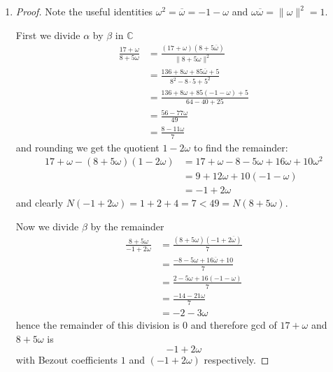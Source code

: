 \documentclass[12pt]{article}
\begin{document}
\begin{enumerate}
    \item[(ii)]
    \begin{proof}
        Note the useful identities $\omega^2 = \overline{\omega} = -1 - \omega$ and $\omega\overline{\omega} = \| \omega \|^2 = 1$.

        First we divide $\alpha$ by $\beta$ in $\mathbb C$
        \begin{align*}
            \frac{17 + \omega}{8 + 5\omega} &= \frac{(17 + \omega)(8 + 5\overline{\omega})}{\| 8 + 5\omega \|^2} \\
            &= \frac{136 + 8\omega + 85\overline{\omega} + 5}{8^2 - 8 \cdot 5 + 5^2} \\
            &= \frac{136 + 8\omega + 85(-1-\omega) + 5}{64 - 40 + 25} \\
            &= \frac{56 - 77\omega}{49} \\
            &= \frac{8 - 11\omega}{7} 
        \end{align*}
        and rounding we get the quotient $1 - 2\omega$ to find the remainder:
        \begin{align*}
            17 + \omega - (8 + 5\omega)(1 - 2\omega) &= 17 + \omega - 8 - 5\omega + 16\omega + 10\omega^2 \\
            &= 9 + 12\omega + 10(-1-\omega) \\
            &= -1 + 2\omega
        \end{align*}
        and clearly $N(-1 + 2\omega) = 1 + 2 + 4 = 7 < 49 = N(8 + 5\omega)$.

        Now we divide $\beta$ by the remainder
        \begin{align*}
            \frac{8 + 5\omega}{-1 + 2\omega} &= \frac{(8 + 5\omega)(-1 + 2\overline{\omega})}{7} \\
            &= \frac{-8 -5\omega + 16\overline{\omega} + 10}{7} \\
            &= \frac{2 - 5\omega + 16(-1-\omega)}{7} \\
            &= \frac{-14 - 21\omega}{7} \\
            &= -2 - 3\omega
        \end{align*}
        hence the remainder of this division is $0$ and therefore gcd of $17 + \omega$ and $8 + 5\omega$ is
        \[  -1 + 2\omega \]
        with Bezout coefficients $1$ and $(-1 + 2\omega)$ respectively.

    \end{proof}
\end{enumerate}
\end{document}
